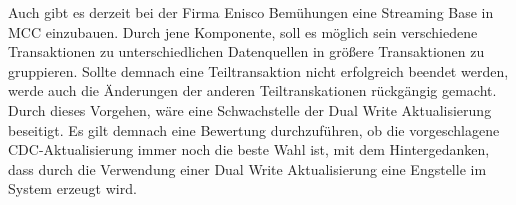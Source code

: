 Auch gibt es derzeit bei der Firma Enisco Bemühungen eine Streaming Base in MCC einzubauen. Durch jene Komponente, soll es möglich sein verschiedene Transaktionen zu unterschiedlichen Datenquellen in größere Transaktionen zu gruppieren. Sollte demnach eine Teiltransaktion nicht erfolgreich beendet werden, werde auch die Änderungen der anderen Teiltranskationen rückgängig gemacht. Durch dieses Vorgehen, wäre eine Schwachstelle der \glqq Dual Write Aktualisierung\grqq{} beseitigt. Es gilt demnach eine Bewertung durchzuführen, ob die vorgeschlagene \glqq CDC-Aktualisierung\grqq{} immer noch die beste Wahl ist, mit dem Hintergedanken, dass durch die Verwendung einer \glqq Dual Write Aktualisierung\grqq{} eine Engstelle im System erzeugt wird.

